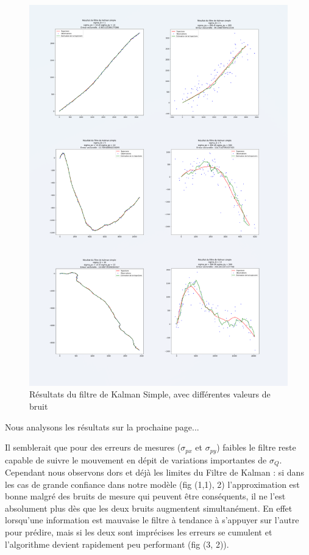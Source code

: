 \begin{figure}[hbt!]
	\centering
	\includegraphics[scale=1]{./images/rr.png}
	\caption{\centering Résultats du filtre de Kalman Simple, avec différentes valeurs de bruit}
\end{figure}
\FloatBarrier

Nous analysons les résultats sur la prochaine page...

\newpage

Il semblerait que pour des erreurs de mesures ($\sigma_{px}$ et $\sigma_{py}$) faibles le filtre reste capable de suivre le mouvement en dépit de variations importantes de $\sigma_{Q}$. Cependant nous observons dors et déjà les limites du Filtre de Kalman : si dans les cas de
grande confiance dans notre modèle (fig (1,1), 2) l’approximation est bonne malgré des bruits de mesure qui peuvent être conséquents, il ne l’est absolument plus dès que les deux bruits augmentent simultanément. En effet lorsqu'une information est mauvaise le filtre à tendance à s’appuyer sur l’autre pour prédire, mais si les deux sont imprécises les erreurs se cumulent et l’algorithme devient rapidement peu performant (fig (3, 2)).

